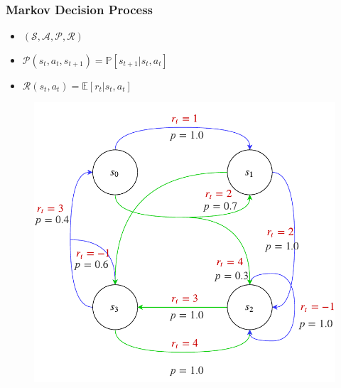 \documentclass{beamer}
\begin{document}
\begin{frame}
  \frametitle{Markov Decision Process}
  \begin{itemize}
    \item $\left( \mathcal{S}, \mathcal{A}, \mathcal{P}, \mathcal{R} \right)$
    \item $\mathcal{P}(s_t, a_t, s_{t+1}) = \mathbb{P} \left[ s_{t+1} \vert s_t, a_t\right]$
    \item $\mathcal{R}(s_t, a_t) = \mathbb{E} \left[ r_t \vert s_t, a_t \right]$
  \end{itemize}
  \begin{figure}
    \includegraphics[scale=0.5]{assets/mdp.pdf}
  \end{figure}
\end{frame}
\end{document}
